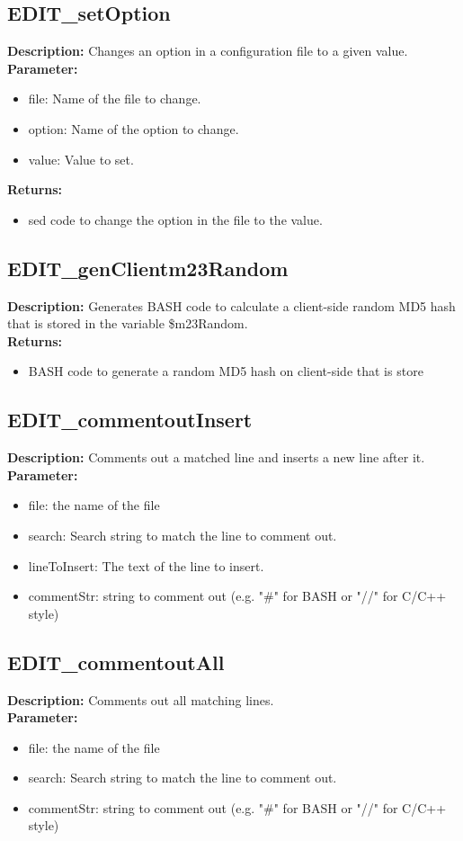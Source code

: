\subsection{EDIT\_setOption}
\textbf{Description:} Changes an option in a configuration file to a given value.\\
\textbf{Parameter:}
\begin{itemize}
\item file: Name of the file to change.
\item option: Name of the option to change.
\item value: Value to set.
\end{itemize}
\textbf{Returns:}
\begin{itemize}
\item sed code to change the option in the file to the value.
\end{itemize}

\subsection{EDIT\_genClientm23Random}
\textbf{Description:} Generates BASH code to calculate a client-side random MD5 hash that is stored in the variable \$m23Random.\\
\textbf{Returns:}
\begin{itemize}
\item BASH code to generate a random MD5 hash on client-side that is store
\end{itemize}

\subsection{EDIT\_commentoutInsert}
\textbf{Description:} Comments out a matched line and inserts a new line after it.\\
\textbf{Parameter:}
\begin{itemize}
\item file: the name of the file
\item search: Search string to match the line to comment out.
\item lineToInsert: The text of the line to insert.
\item commentStr: string to comment out (e.g. "\#" for BASH or "//" for C/C++ style)
\end{itemize}

\subsection{EDIT\_commentoutAll}
\textbf{Description:} Comments out all matching lines.\\
\textbf{Parameter:}
\begin{itemize}
\item file: the name of the file
\item search: Search string to match the line to comment out.
\item commentStr: string to comment out (e.g. "\#" for BASH or "//" for C/C++ style)
\end{itemize}

